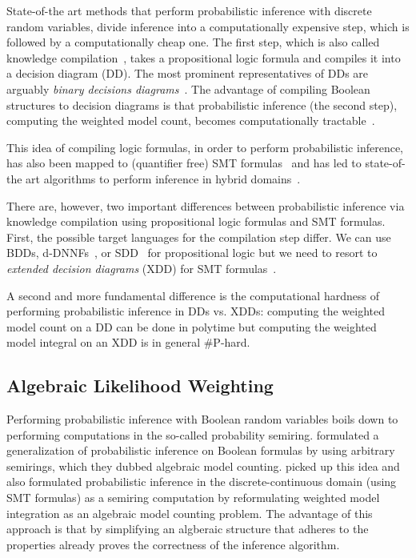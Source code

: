 State-of-the art methods that perform probabilistic inference with discrete random variables, divide inference into a computationally expensive step, which is followed by a computationally cheap one. The first step, which is also called knowledge compilation~\citep{darwiche2002knowledge}, takes a propositional logic formula and compiles it into a decision diagram (DD). The most prominent representatives of DDs are arguably {\em binary decisions diagrams}~\citep{bryant1986graph}. The advantage of compiling Boolean structures to decision diagrams is that probabilistic inference (the second step), \ie computing the weighted model count, becomes computationally tractable~\citep{chavira2008probabilistic}.

This idea of compiling logic formulas, in order to perform probabilistic inference, has also been mapped to (quantifier free) SMT formulas~\citep{kolb2018efficient,zuidbergdosmartires2019exact} and
has led to state-of-the art algorithms to perform inference in hybrid domains~\citep{derkinderen2020ordering}.

There are, however, two important differences between probabilistic inference via knowledge compilation using propositional logic formulas and SMT formulas. First, the possible target languages for the compilation step differ. We can use BDDs, d-DNNFs~\citep{darwiche2004ddnnf}, or SDD~\citep{darwiche2011sdd} for propositional logic but we need to resort to {\em  extended decision diagrams} (XDD) for SMT formulas~\citep{sanner2011symbolic,zuidbergdosmartires2019exact,kolb2019exploit}.

A second and more fundamental difference is the computational hardness of performing probabilistic inference in DDs vs. XDDs: computing the weighted model count on a DD can be done in polytime but computing the weighted model integral on an XDD is in general \#P-hard.


\subsection{Algebraic Likelihood Weighting}

Performing probabilistic inference with Boolean random variables boils down to performing computations in the so-called probability semiring. \citet{kimmig2017algebraic} formulated a generalization of probabilistic inference on Boolean formulas by using arbitrary semirings, which they dubbed algebraic model counting. 
\citet{zuidbergdosmartires2019exact} picked up this idea and also formulated probabilistic inference in the discrete-continuous domain (using SMT formulas) as a semiring computation by reformulating weighted model integration as an algebraic model counting problem. The advantage of this approach is that by simplifying an algberaic structure that adheres to the properties already proves the correctness of the inference algorithm. 






